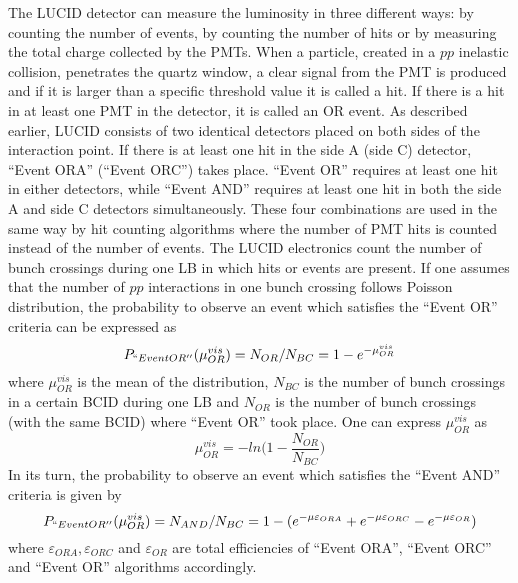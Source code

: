 The LUCID detector can measure the luminosity in three different ways: 
by counting the number of events, by counting the number of hits or by measuring the total charge collected by the PMTs. 
When a particle, created in a $pp$ inelastic collision, 
penetrates the quartz window, a clear signal from the PMT is produced and if it is larger than a specific threshold value it is called a hit. 
If there is a hit in at least one PMT in the detector, it is called an OR event. 
As described earlier, LUCID consists of two identical detectors placed on both sides of the interaction point. 
If there is at least one hit in the side A (side C) detector, ``Event ORA'' (``Event ORC'') takes place. 
``Event OR'' requires at least one hit in either detectors, while ``Event AND'' requires at least one hit in both the side A and side C detectors simultaneously. 
These four combinations are used in the same way by hit counting algorithms where the number of PMT hits is counted instead of the number of events.
The LUCID electronics count the number of bunch crossings during one LB in which hits or events are present.
If one assumes that the number of $pp$ interactions in one bunch crossing follows Poisson distribution, 
the probability to observe an event which satisfies the ``Event OR'' criteria can be expressed as
\begin{equation}
P_{``Event OR''} (\mu_{OR}^{vis}) = N_{OR} / N_{BC} = 1 - e^{-\mu_{OR}^{vis}}
\label{eq:poissonProb}
\end{equation}
where $\mu_{OR}^{vis}$ is the mean of the distribution, $N_{BC}$ is the number of bunch crossings in a certain BCID during one LB and $N_{OR}$ is the number of bunch crossings 
(with the same BCID) where ``Event OR'' took place. One can express $\mu_{OR}^{vis}$ as
\begin{equation}
\mu_{OR}^{vis} = -ln\Big( 1 - \dfrac{N_{OR}}{N_{BC}}\Big)
\label{eq:logFormula}
\end{equation}
In its turn, the probability to observe an event which satisfies the ``Event AND'' criteria is given by
\begin{equation}
P_{``Event OR''} (\mu_{OR}^{vis}) = N_{AND} / N_{BC} = 1 - ( e^{-\mu \varepsilon_{ORA} } + e^{-\mu \varepsilon_{ORC} } - e^{-\mu \varepsilon_{OR} } )
\label{eq:poissonProb_EventAND}
\end{equation}
where $\varepsilon_{ORA}, \varepsilon_{ORC}$ and $\varepsilon_{OR}$ are total efficiencies of ``Event ORA'', ``Event ORC'' and ``Event OR'' algorithms accordingly.

